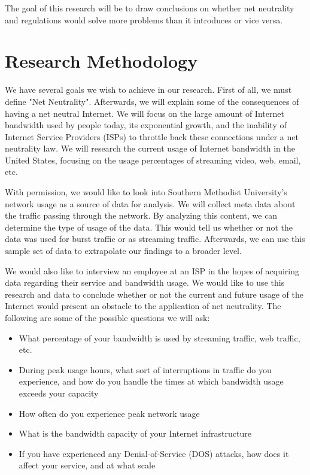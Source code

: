 \documentclass{sigcomm-alternate}
\begin{document}
The goal of this research will be to draw conclusions on whether net neutrality and regulations would solve more problems than it introduces or vice versa.

     		
\section{Research Methodology}
We have several goals we wish to achieve in our research. First of all, we must define "Net Neutrality". Afterwards, we will explain some of the consequences of having a net neutral Internet. We will focus on the large amount of Internet bandwidth used by people today, its exponential growth, and the inability of Internet Service Providers (ISPs) to throttle back these connections under a net neutrality law. We will research the current usage of Internet bandwidth in the United States, focusing on the usage percentages of streaming video, web, email, etc. 

With permission, we would like to look into Southern Methodist University's network usage as a source of data for analysis. We will collect meta data about the traffic passing through the network. By analyzing this content, we can determine the type of usage of the data. This would tell us whether or not the data was used for burst traffic or as streaming traffic. Afterwards, we can use this sample set of data to extrapolate our findings to a broader level. 

We would also like to interview an employee at an ISP in the hopes of acquiring data regarding their service and bandwidth usage. We would like to use this research and data to conclude whether or not the current and future usage of the Internet would present an obstacle to the application of net neutrality. The following are some of the possible questions we will ask:

\begin{itemize}
	\item What percentage of your bandwidth is used by streaming traffic, web traffic, etc.
	\item During peak usage hours, what sort of interruptions in traffic do you experience, and how do you handle the times at which bandwidth usage exceeds your capacity
	\item How often do you experience peak network usage
	\item What is the bandwidth capacity of your Internet infrastructure
	\item If you have experienced any Denial-of-Service (DOS) attacks, how does it affect your service, and at what scale
\end{itemize}
\end{document}
